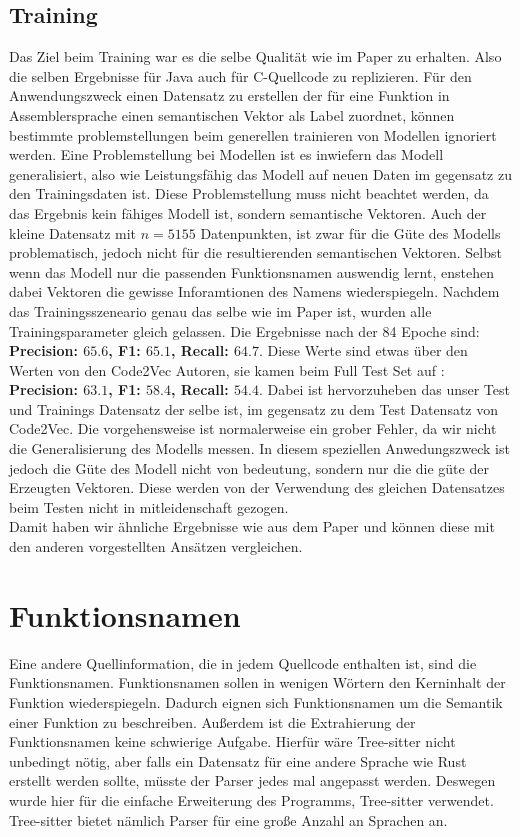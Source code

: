 \documentclass[12pt,letterpaper,ngerman]{article}
\begin{document}
\subsection{Training}
Das Ziel beim Training war es die selbe Qualität wie im Paper zu erhalten.
Also die selben Ergebnisse für Java auch für C-Quellcode zu replizieren.
Für den Anwendungszweck einen Datensatz zu erstellen der für eine Funktion
in Assemblersprache einen semantischen Vektor als Label zuordnet, können
bestimmte problemstellungen beim generellen trainieren von Modellen 
ignoriert werden. Eine Problemstellung bei Modellen ist es inwiefern
das Modell generalisiert, also wie Leistungsfähig das Modell auf
neuen Daten im gegensatz zu den Trainingsdaten ist. Diese Problemstellung
muss nicht beachtet werden, da das Ergebnis kein fähiges Modell ist, sondern
semantische Vektoren. Auch der kleine Datensatz mit $n = 5155$ Datenpunkten,
ist zwar für die Güte des Modells problematisch, jedoch nicht für die
resultierenden semantischen Vektoren. Selbst wenn das Modell nur die 
passenden Funktionsnamen auswendig lernt, enstehen dabei Vektoren die
gewisse Inforamtionen des Namens wiederspiegeln. Nachdem das Trainingsszeneario
genau das selbe wie im Paper ist, wurden alle Trainingsparameter gleich gelassen.
Die Ergebnisse nach der 84 Epoche sind: {\bf Precision: $65.6$, F1: $65.1$, 
Recall: $64.7$}. Diese Werte sind etwas über den Werten von den Code2Vec 
Autoren, sie kamen beim Full Test Set auf : {\bf Precision: $63.1$, F1: $58.4$, 
Recall: $54.4$}. Dabei ist hervorzuheben das unser Test und Trainings Datensatz
der selbe ist, im gegensatz zu dem Test Datensatz von Code2Vec. Die vorgehensweise
ist normalerweise ein grober Fehler, da wir nicht die Generalisierung des 
Modells messen. In diesem speziellen Anwedungszweck ist jedoch die Güte des
Modell nicht von bedeutung, sondern nur die die güte der Erzeugten Vektoren.
Diese werden von der Verwendung des gleichen Datensatzes beim Testen nicht in
mitleidenschaft gezogen. \\
Damit haben wir ähnliche Ergebnisse wie aus dem Paper und können diese mit
den anderen vorgestellten Ansätzen vergleichen.
\section{Funktionsnamen}
Eine andere Quellinformation, die in jedem Quellcode enthalten ist,
sind die Funktionsnamen. 
Funktionsnamen sollen in wenigen Wörtern den Kerninhalt der Funktion
wiederspiegeln. %
Dadurch eignen sich Funktionsnamen um die Semantik einer Funktion 
zu beschreiben. Außerdem ist die Extrahierung der Funktionsnamen
keine schwierige Aufgabe. Hierfür wäre Tree-sitter nicht unbedingt
nötig, aber falls ein Datensatz für eine andere Sprache wie Rust
erstellt werden sollte, müsste der Parser jedes mal angepasst werden.
Deswegen wurde hier für die einfache Erweiterung des Programms,
Tree-sitter verwendet. Tree-sitter bietet nämlich Parser für eine
große Anzahl an Sprachen an.
\end{document}

